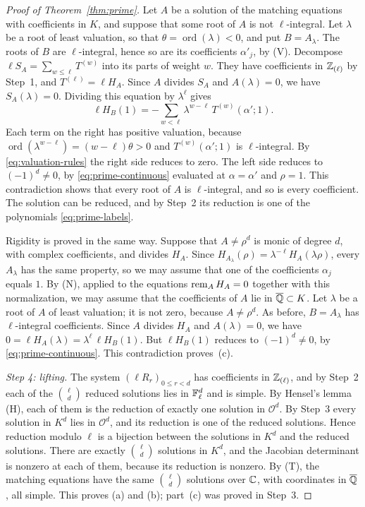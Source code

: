 \begin{proof}[Proof of Theorem~\ref{thm:prime}]
Let \(A\) be a solution of the matching equations with coefficients in
\(K\), and suppose that some root of \(A\) is not \(\ell\)-integral. Let
\(\lambda\) be a root of least valuation, so that
\(\theta=\operatorname{ord}(\lambda)<0\), and put \(B=A_\lambda\). The
roots of \(B\) are \(\ell\)-integral, hence so are its coefficients
\(\alpha'_j\), by \textup{(V)}. Decompose
\(\ell S_A=\sum_{w\le\ell}T^{(w)}\) into its parts of weight \(w\). They
have coefficients in \(\mathbb Z_{(\ell)}\) by Step~1, and
\(T^{(\ell)}=\ell H_A\). Since \(A\) divides \(S_A\) and
\(A(\lambda)=0\), we have \(S_A(\lambda)=0\). Dividing this equation by
\(\lambda^{\ell}\) gives
\[
 \ell H_B(1)=-\sum_{w<\ell}\lambda^{w-\ell}\,T^{(w)}(\alpha';1).
\]
Each term on the right has positive valuation, because
\(\operatorname{ord}(\lambda^{w-\ell})=(w-\ell)\theta>0\) and
\(T^{(w)}(\alpha';1)\) is \(\ell\)-integral. By
\eqref{eq:valuation-rules} the right side reduces to zero. The left side
reduces to \((-1)^d\ne0\), by \eqref{eq:prime-continuous} evaluated at
\(\alpha=\alpha'\) and \(\rho=1\). This contradiction shows that every
root of \(A\) is \(\ell\)-integral, and so is every coefficient. The
solution can be reduced, and by Step~2 its reduction is one of the
polynomials \eqref{eq:prime-labels}.

Rigidity is proved in the same way. Suppose that \(A\ne\rho^d\) is monic
of degree \(d\), with complex coefficients, and divides \(H_A\). Since
\(H_{A_\lambda}(\rho)=\lambda^{-\ell}H_A(\lambda\rho)\), every
\(A_\lambda\) has the same property, so we may assume that one of the
coefficients \(\alpha_j\) equals \(1\). By \textup{(N)}, applied to the
equations \(\operatorname{rem}_{A} H_A=0\) together with this normalization, we may
assume that the coefficients of \(A\) lie in \(\overline{\mathbb Q}\subset K\).
Let \(\lambda\) be a root of \(A\) of least valuation; it is not zero,
because \(A\ne\rho^d\). As before, \(B=A_\lambda\) has \(\ell\)-integral
coefficients. Since \(A\) divides \(H_A\) and \(A(\lambda)=0\), we have
\(0=\ell H_A(\lambda)=\lambda^{\ell}\,\ell H_B(1)\). But \(\ell H_B(1)\)
reduces to \((-1)^d\ne0\), by \eqref{eq:prime-continuous}. This
contradiction proves~(c).

\emph{Step 4: lifting.} The system \((\ell R_r)_{0\le r<d}\) has
coefficients in \(\mathbb Z_{(\ell)}\), and by Step~2 each of the
\(\binom{\ell}{d}\) reduced solutions lies in \(\mathbb F_\ell^d\) and is
simple. By Hensel's lemma \textup{(H)}, each of them is the reduction of
exactly one solution in \(\mathcal O^d\). By Step~3 every solution in
\(K^d\) lies in \(\mathcal O^d\), and its reduction is one of the
reduced solutions. Hence reduction modulo \(\ell\) is a bijection
between the solutions in \(K^d\) and the reduced solutions. There are
exactly \(\binom{\ell}{d}\) solutions in \(K^d\), and the Jacobian
determinant is nonzero at each of them, because its reduction is
nonzero. By \textup{(T)}, the matching equations have the same
\(\binom{\ell}{d}\) solutions over \(\mathbb C\), with coordinates in
\(\overline{\mathbb Q}\), all simple. This proves (a) and (b); part~(c) was
proved in Step~3.
\end{proof}

